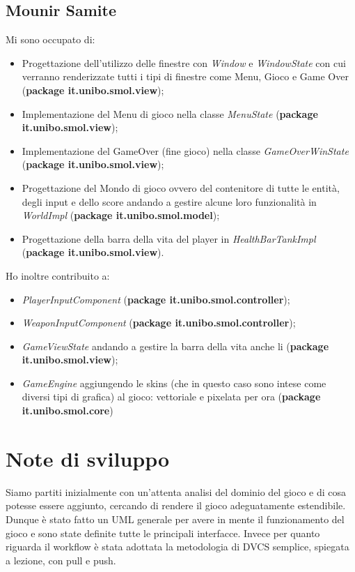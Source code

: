 \documentclass[a4paper,12pt]{report}
\begin{document}
\subsection*{Mounir Samite}
Mi sono occupato di:
\begin{itemize}
    \item Progettazione dell'utilizzo delle finestre con \emph{Window} e \emph{WindowState} con cui verranno renderizzate tutti i tipi di finestre come Menu, Gioco e Game Over (\textbf{package it.unibo.smol.view});
    \item Implementazione del Menu di gioco nella classe \emph{MenuState} (\textbf{package it.unibo.smol.view});
    \item Implementazione del GameOver (fine gioco) nella classe \emph{GameOverWinState} (\textbf{package it.unibo.smol.view});
    \item Progettazione del Mondo di gioco ovvero del contenitore di tutte le entità, degli input e dello score andando a gestire alcune loro funzionalità in \emph{WorldImpl} (\textbf{package it.unibo.smol.model});
    \item Progettazione della barra della vita del player in \emph{HealthBarTankImpl} (\textbf{package it.unibo.smol.view}).
\end{itemize}
Ho inoltre contribuito a:
\begin{itemize}
    \item \emph{PlayerInputComponent} (\textbf{package it.unibo.smol.controller});
    \item \emph{WeaponInputComponent} (\textbf{package it.unibo.smol.controller});
    \item \emph{GameViewState} andando a gestire la barra della vita anche li (\textbf{package it.unibo.smol.view});
    \item \emph{GameEngine} aggiungendo le skins (che in questo caso sono intese come diversi tipi di grafica) al gioco: vettoriale e pixelata per ora (\textbf{package it.unibo.smol.core}) 
\end{itemize}

\section{Note di sviluppo}
Siamo partiti inizialmente con un'attenta analisi del dominio del gioco e di cosa potesse essere aggiunto, cercando di rendere il gioco adeguatamente estendibile.
Dunque è stato fatto un UML generale per avere in mente il funzionamento del gioco e sono state definite tutte le principali interfacce.
Invece per quanto riguarda il workflow è stata adottata la metodologia di DVCS semplice, spiegata a lezione, con pull e push.
\end{document}
